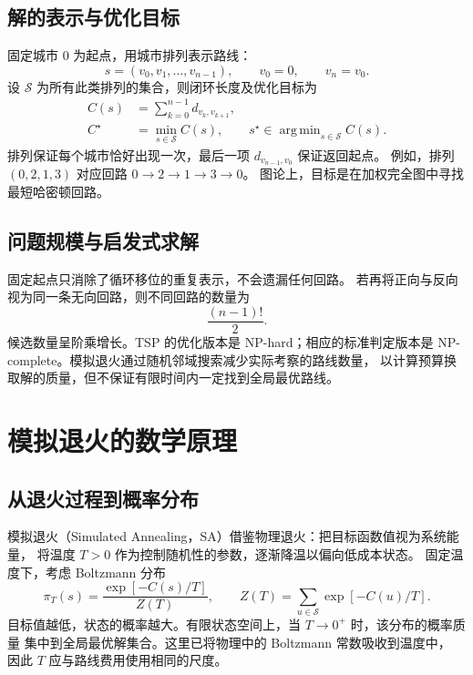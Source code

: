\documentclass[UTF8,a4paper,11pt,fontset=none]{ctexart}
\numberwithin{equation}{section}
\newcommand{\states}{\mathcal{S}}
\DeclareMathOperator*{\argmin}{arg\,min}
\begin{document}
\subsection{解的表示与优化目标}
固定城市 $0$ 为起点，用城市排列表示路线：
\begin{equation}
  s=(v_0,v_1,\ldots,v_{n-1}),\qquad v_0=0,\qquad v_n=v_0.
\end{equation}
设 $\states$ 为所有此类排列的集合，则闭环长度及优化目标为
\begin{align}
  C(s)&=\sum_{k=0}^{n-1}d_{v_k,v_{k+1}},
  \label{eq:cost}\\
  C^\star&=\min_{s\in\states}C(s),\qquad
  s^\star\in\argmin_{s\in\states}C(s).
  \label{eq:objective}
\end{align}
排列保证每个城市恰好出现一次，最后一项 $d_{v_{n-1},v_0}$ 保证返回起点。
例如，排列 $(0,2,1,3)$ 对应回路 $0\to2\to1\to3\to0$。
图论上，目标是在加权完全图中寻找最短哈密顿回路。

\subsection{问题规模与启发式求解}
固定起点只消除了循环移位的重复表示，不会遗漏任何回路。
若再将正向与反向视为同一条无向回路，则不同回路的数量为
\begin{equation}
  \frac{(n-1)!}{2}.
\end{equation}
候选数量呈阶乘增长。TSP 的优化版本是 NP-hard；相应的标准判定版本是
NP-complete\cite{cook}。模拟退火通过随机邻域搜索减少实际考察的路线数量，
以计算预算换取解的质量，但不保证有限时间内一定找到全局最优路线。

\section{模拟退火的数学原理}
\subsection{从退火过程到概率分布}
模拟退火（Simulated Annealing，SA）借鉴物理退火：把目标函数值视为系统能量，
将温度 $T>0$ 作为控制随机性的参数，逐渐降温以偏向低成本状态\cite{kirkpatrick}。
固定温度下，考虑 Boltzmann 分布
\begin{equation}
  \pi_T(s)=\frac{\exp[-C(s)/T]}{Z(T)},\qquad
  Z(T)=\sum_{u\in\states}\exp[-C(u)/T].
  \label{eq:boltzmann}
\end{equation}
目标值越低，状态的概率越大。有限状态空间上，当 $T\to0^+$ 时，该分布的概率质量
集中到全局最优解集合。这里已将物理中的 Boltzmann 常数吸收到温度中，
因此 $T$ 应与路线费用使用相同的尺度。
\end{document}

